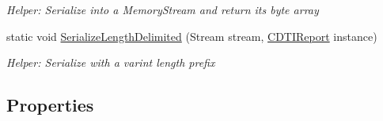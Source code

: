 \begin{DoxyCompactItemize}
\begin{DoxyCompactList}\small\item\em Helper\+: Serialize into a Memory\+Stream and return its byte array\end{DoxyCompactList}\item 
static void \hyperlink{class_example_1_1_c_d_t_i_report_a587ec4906faa62164e4dd7106ab43172}{Serialize\+Length\+Delimited} (Stream stream, \hyperlink{class_example_1_1_c_d_t_i_report}{C\+D\+T\+I\+Report} instance)
\begin{DoxyCompactList}\small\item\em Helper\+: Serialize with a varint length prefix\end{DoxyCompactList}\end{DoxyCompactItemize}
\subsection*{Properties}
